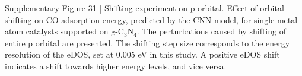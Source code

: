 Supplementary Figure 31 | Shifting experiment on p orbital. Effect of orbital shifting on CO adsorption energy, predicted by the CNN model, for single metal atom catalysts supported on g-C$_3$N$_4$. The perturbations caused by shifting of entire p orbital are presented. The shifting step size corresponds to the energy resolution of the eDOS, set at 0.005 eV in this study. A positive eDOS shift indicates a shift towards higher energy levels, and vice versa.

